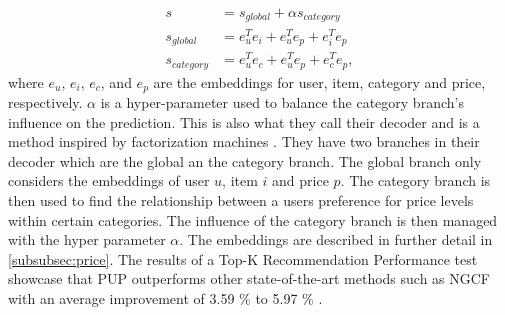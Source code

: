 \begin{equation}
    \begin{split}
        s & = s_{global} + \alpha s_{category} \\
        s_{global} & = e^T_u e_i + e^T_u e_p + e^T_i e_p \\
        s_{category} & = e^T_u e_c + e^T_u e_p + e^T_c e_p,
    \end{split}
    \label{eq:price-aware-prediction}
\end{equation}
where $e_u$, $e_i$, $e_c$, and $e_p$ are the embeddings for user, item, category and price, respectively.
$\alpha$ is a hyper-parameter used to balance the category branch's influence on the prediction.
This is also what they call their decoder and is a method inspired by factorization machines \cite{Priceaware}.
They have two branches in their decoder which are the global an the category branch.
The global branch only considers the embeddings of user $u$, item $i$ and price $p$.
The category branch is then used to find the relationship between a users preference for price levels within certain categories.
The influence of the category branch is then managed with the hyper parameter $\alpha$.
The embeddings are described in further detail in \autoref{subsubsec:price}.
The results of a Top-K Recommendation Performance test showcase that PUP outperforms other state-of-the-art methods such as NGCF with an average improvement of 3.59 \% to 5.97 \% \cite{Priceaware}.
